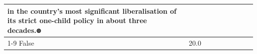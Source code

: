 \begin{table}[H]
\begin{tabular}{lllrlllll}
in the country's most significant liberalisation of its strict one-child policy in about three decades.ၜ \\
\cline{1-9}
False & 20.0%
\end{tabular}
\end{table}
